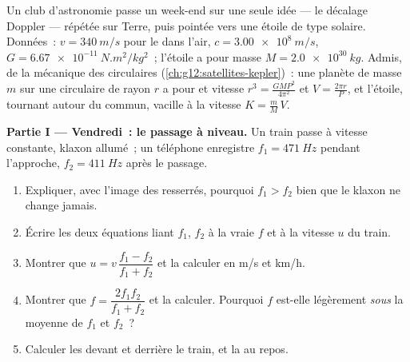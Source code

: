 \begin{problem}
\label{pb:g12:doppler-effect:1}
Un club d'astronomie passe un week-end sur une seule idée --- le
décalage Doppler --- répétée sur Terre, puis pointée vers une étoile
de type solaire. Données~: $v = \qty{340}{m/s}$ pour le
 dans l'air, $c = \qty{3.00e8}{m/s}$,
$G = \qty{6.67e-11}{N.m^2/kg^2}$~; l'étoile a pour masse
$M = \qty{2.0e30}{kg}$. Admis, de la mécanique des
 circulaires
(\cref{ch:g12:satellites-kepler})~: une planète de masse $m$ sur une
 circulaire de rayon $r$ a pour
 et vitesse $r^3 = \frac{G M P^2}{4\pi^2}$ et
$V = \frac{2\pi r}{P}$, et l'étoile, tournant autour du
 commun, vacille à la vitesse
$K = \frac{m}{M}\,V$.

\medskip
\noindent\textbf{Partie I --- Vendredi~: le passage à niveau.}
Un train passe à vitesse constante, klaxon allumé~; un téléphone
enregistre $f_1 = \qty{471}{Hz}$ pendant l'approche,
$f_2 = \qty{411}{Hz}$ après le passage.
\begin{enumerate}
  \item Expliquer, avec l'image des  resserrés,
        pourquoi $f_1 > f_2$ bien que le klaxon ne change jamais.
  \item Écrire les deux équations liant $f_1$, $f_2$ à la vraie
         $f$ et à la vitesse $u$ du train.
  \item Montrer que $u = v\,\dfrac{f_1 - f_2}{f_1 + f_2}$ et la calculer
        en \unit{m/s} et \unit{km/h}.
  \item Montrer que $f = \dfrac{2 f_1 f_2}{f_1 + f_2}$ et la calculer.
        Pourquoi $f$ est-elle légèrement \emph{sous} la moyenne de
        $f_1$ et $f_2$~?
  \item Calculer les  devant et derrière le
        train, et la  au repos.
\end{enumerate}


\end{problem}

